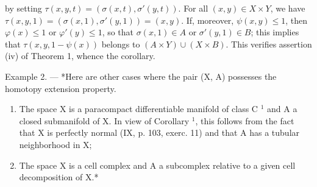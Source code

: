 by setting \(\tau(x,y,t) = (\sigma(x,t),\sigma'(y,t))\). For all \((x,y)\in X\times Y\), we have \(\tau(x,y,1) = (\sigma(x,1),\sigma'(y,1)) = (x,y)\). If, moreover, \(\psi(x,y)\leqslant 1\), then \(\varphi(x)\leqslant 1\) or \(\varphi'(y)\leqslant 1\), so that \(\sigma(x,1)\in A\) or \(\sigma'(y,1)\in B\); this implies that \(\tau(x,y,1 - \psi(x))\) belongs to \((A\times Y)\cup (X\times B)\). This verifies assertion (iv) of Theorem 1, whence the corollary.

Example 2. --- *Here are other cases where the pair (X, A) possesses the homotopy extension property.

\begin{enumerate}
\def\labelenumi{(\roman{enumi})}
\item
  The space X is a paracompact differentiable manifold of class C \(^{1}\) and A a closed submanifold of X. In view of Corollary \(^{1}\), this follows from the fact that X is perfectly normal (IX, p. 103, exerc. 11) and that A has a tubular neighborhood in X;
\item
  The space X is a cell complex and A a subcomplex relative to a given cell decomposition of X.*
\end{enumerate}
\relax{}
